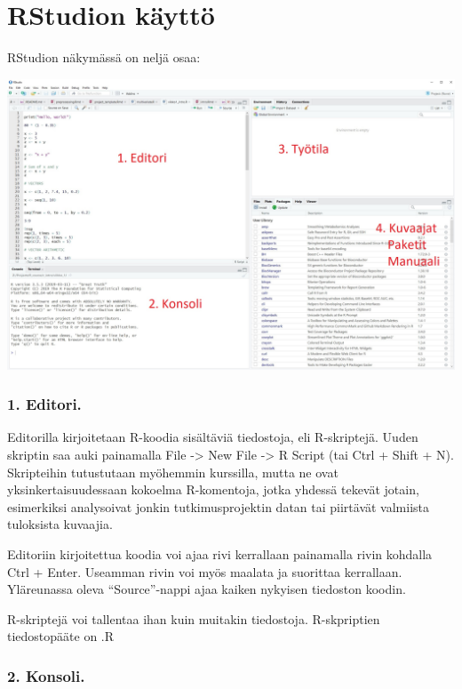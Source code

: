 \documentclass[
]{book}
\begin{document}
\hypertarget{rstudion-kuxe4yttuxf6}{%
\section*{RStudion käyttö}\label{rstudion-kuxe4yttuxf6}}

RStudion näkymässä on neljä osaa:

\includegraphics{files/00-start/RStudio_tutorial_edited.jpg}

\hypertarget{editori.}{%
\subsubsection*{1. Editori.}\label{editori.}}

Editorilla kirjoitetaan R-koodia sisältäviä tiedostoja, eli R-skriptejä. Uuden skriptin saa auki painamalla File -\textgreater{} New File -\textgreater{} R Script (tai Ctrl + Shift + N). Skripteihin tutustutaan myöhemmin kurssilla, mutta ne ovat yksinkertaisuudessaan kokoelma R-komentoja, jotka yhdessä tekevät jotain, esimerkiksi analysoivat jonkin tutkimusprojektin datan tai piirtävät valmiista tuloksista kuvaajia.

Editoriin kirjoitettua koodia voi ajaa rivi kerrallaan painamalla rivin kohdalla Ctrl + Enter. Useamman rivin voi myös maalata ja suorittaa kerrallaan. Yläreunassa oleva ``Source''-nappi ajaa kaiken nykyisen tiedoston koodin.

R-skriptejä voi tallentaa ihan kuin muitakin tiedostoja. R-skpriptien tiedostopääte on .R

\hypertarget{konsoli.}{%
\subsubsection*{2. Konsoli.}\label{konsoli.}}
\end{document}
